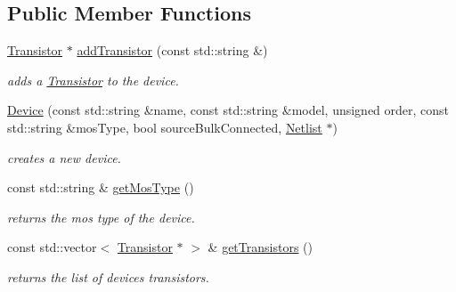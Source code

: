 \subsection*{Public Member Functions}
\begin{DoxyCompactItemize}
\item 
\hyperlink{class_open_chams_1_1_transistor}{Transistor} $\ast$ \hyperlink{class_open_chams_1_1_device_ad45d34f8765dd113a5b12289efe66c07}{add\+Transistor} (const std\+::string \&)
\begin{DoxyCompactList}\small\item\em adds a \hyperlink{class_open_chams_1_1_transistor}{Transistor} to the device. \end{DoxyCompactList}\item 
\hyperlink{class_open_chams_1_1_device_af5d1871d38a605955d7848d07df6d9a4}{Device} (const std\+::string \&name, const std\+::string \&model, unsigned order, const std\+::string \&mos\+Type, bool source\+Bulk\+Connected, \hyperlink{class_open_chams_1_1_netlist}{Netlist} $\ast$)
\begin{DoxyCompactList}\small\item\em creates a new device. \end{DoxyCompactList}\item 
\mbox{\label{class_open_chams_1_1_device_a831ce553c23908f447a5be332ecd5946}} 
const std\+::string \& \hyperlink{class_open_chams_1_1_device_a831ce553c23908f447a5be332ecd5946}{get\+Mos\+Type} ()
\begin{DoxyCompactList}\small\item\em returns the mos type of the device. \end{DoxyCompactList}\item 
\mbox{\label{class_open_chams_1_1_device_a4033525cab6387eb057f71f5feed9802}} 
const std\+::vector$<$ \hyperlink{class_open_chams_1_1_transistor}{Transistor} $\ast$ $>$ \& \hyperlink{class_open_chams_1_1_device_a4033525cab6387eb057f71f5feed9802}{get\+Transistors} ()
\begin{DoxyCompactList}\small\item\em returns the list of device\textquotesingle{}s transistors. \end{DoxyCompactList}\item 
\mbox{\label{class_open_chams_1_1_device_aa9d93f306256ac57b8bb8a4cb436c8d3}} 

\end{DoxyCompactItemize}
